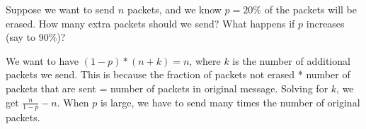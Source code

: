 \question Suppose we want to send $n$ packets, and we know $p = 20\%$ 
of the packets will be erased. How many extra packets should we send? 
What happens if $p$ increases (say to $90\%$)?
\begin{solution}[.1 in]
We want to have $(1-p)*(n + k) = n$, where $k$ is the number of 
additional packets we send. This is because the fraction of packets not erased * number of packets that are sent = number of packets in original message. Solving for $k$, we get $\frac{n}{1 - p} - n$.  
When $p$ is large, we have to send many times the number of original packets. 

\end{solution}